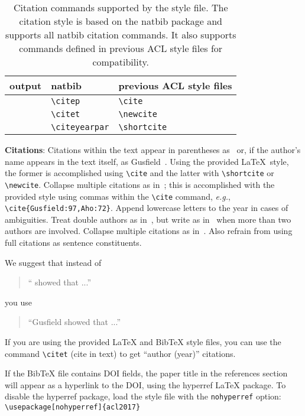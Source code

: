 \documentclass[11pt,a4paper]{article}
\begin{document}
\begin{table*}
\centering
\begin{tabular}{lll}
  output & natbib & previous ACL style files\\
  \hline
  \citep{Gusfield:97} & \verb|\citep| & \verb|\cite| \\
  \citet{Gusfield:97} & \verb|\citet| & \verb|\newcite| \\
  \citeyearpar{Gusfield:97} & \verb|\citeyearpar| & \verb|\shortcite| \\
\end{tabular}
\caption{Citation commands supported by the style file.
  The citation style is based on the natbib package and
  supports all natbib citation commands.
  It also supports commands defined in previous ACL style files
  for compatibility.
  }
\end{table*}

{\bf Citations}: Citations within the text appear in parentheses
as~\cite{Gusfield:97} or, if the author's name appears in the text
itself, as Gusfield~.
Using the provided \LaTeX\ style, the former is accomplished using
{\small\verb|\cite|} and the latter with {\small\verb|\shortcite|} or {\small\verb|\newcite|}.  Collapse multiple citations as in~\cite{Gusfield:97,Aho:72}; this is accomplished with the provided style using commas within the {\small\verb|\cite|} command, {\em e.g.}, {\small\verb|\cite{Gusfield:97,Aho:72}|}.  
Append lowercase letters to the year in cases of ambiguities.  
 Treat double authors as
in~\cite{Aho:72}, but write as in~\cite{Chandra:81} when more than two
authors are involved. Collapse multiple citations as
in~\cite{Gusfield:97,Aho:72}. Also refrain from using full citations
as sentence constituents.


We suggest that instead of
\begin{quote}
  ``\cite{Gusfield:97} showed that ...''
\end{quote}
you use
\begin{quote}
``Gusfield    showed that ...''
\end{quote}

If you are using the provided \LaTeX{} and Bib\TeX{} style files, you
can use the command \verb|\citet| (cite in text)
to get ``author (year)'' citations.

If the Bib\TeX{} file contains DOI fields, the paper
title in the references section will appear as a hyperlink
to the DOI, using the hyperref \LaTeX{} package.
To disable the hyperref package, load the style file
with the \verb|nohyperref| option:
\verb|\usepackage[nohyperref]{acl2017}|
\end{document}
